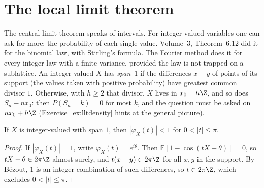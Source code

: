 \section{The local limit theorem}

The central limit theorem speaks of intervals. For integer-valued variables one can ask for more: the probability of each single value. Volume~3,
Theorem~6.12 did it for the binomial law, with Stirling's formula. The Fourier method does it for every integer law with a finite variance,
provided the law is not trapped on a sublattice. An integer-valued $X$ has \emph{span~$1$} if the differences $x-y$ of points of its support (the
values taken with positive probability) have greatest common divisor $1$. Otherwise, with $h\ge2$ that divisor, $X$ lives in $x_0+h\Z$, and so
does $S_n-nx_0$: then $P(S_n=k)=0$ for most $k$, and the question must be asked on $nx_0+h\Z$ (Exercise~\ref{ex:lltdensity} hints at the
general picture).

\begin{lemma}\label{lem:span}
If $X$ is integer-valued with span $1$, then $|\varphi_X(t)|<1$ for $0<|t|\le\pi$.
\end{lemma}
\begin{proof}
If $|\varphi_X(t)|=1$, write $\varphi_X(t)=e^{i\theta}$. Then $\mathbb E[1-\cos(tX-\theta)]=0$, so $tX-\theta\in2\pi\Z$ almost surely, and $t(x-y)\in2\pi\Z$
for all $x,y$ in the support. By B\'ezout, $1$ is an integer combination of such differences, so $t\in2\pi\Z$, which excludes $0<|t|\le\pi$.
\end{proof}

